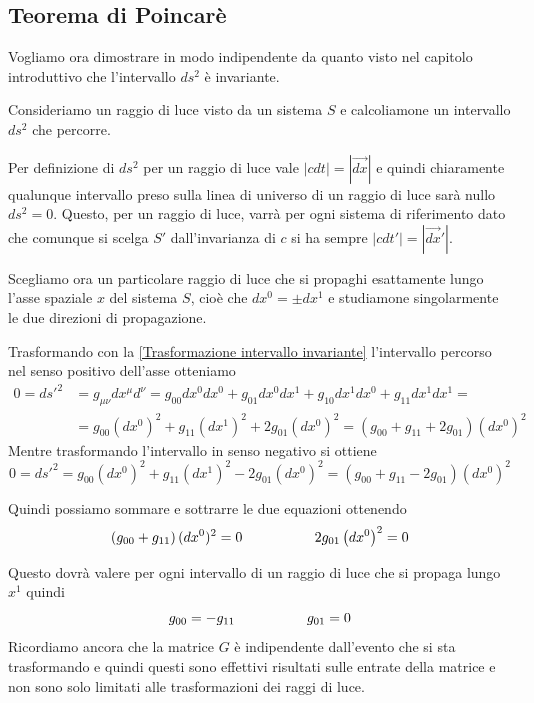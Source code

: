 \documentclass[12pt,a4paper,titlepage, twoside, openright]{book}
\numberwithin{equation}{chapter}
\begin{document}
\subsection{Teorema di Poincarè}\label{sezTeoremaPoincare}
Vogliamo ora dimostrare in modo indipendente da quanto visto nel capitolo introduttivo che l'intervallo $ds^2$ è invariante. 

Consideriamo un raggio di luce visto da un sistema $S$ e calcoliamone un intervallo $ds^2$ che percorre. 

Per definizione di $ds^2$ per un raggio di luce vale
$ \left|cdt\right| =|\vec{dx}| $ e quindi chiaramente qualunque intervallo preso sulla linea di universo di un raggio di luce sarà nullo $ds^2=0$. 
Questo, per un raggio di luce, varrà per ogni sistema di riferimento dato che comunque si scelga $S'$ dall'invarianza di $c$ si ha sempre $ \left|cdt'\right| =|\vec{dx}'| $.

Scegliamo ora un particolare raggio di luce che si propaghi esattamente lungo l'asse spaziale $x$ del sistema $S$, cioè che $dx^0=\pm dx^1$ e studiamone singolarmente le due direzioni di propagazione.

Trasformando con la \eqref{Trasformazione intervallo invariante} l'intervallo percorso nel senso positivo dell'asse otteniamo
\begin{align*}
0 = ds'^2 &= g_{\mu\nu} dx^\mu d^\nu = g_{00} dx^0 dx^0 + g_{01} dx^0 dx^1 + g_{10} dx^1 dx^0 + g_{11} dx^1 dx^1 = \\
&= g_{00}\left(dx^0\right)^2+g_{11}\left(dx^1\right)^2 + 2 g_{01} \left( dx^{0} \right)^2 = \left( g_{00} + g_{11} + 2g_{01} \right) (dx^0)^2
\end{align*}
Mentre trasformando l'intervallo in senso negativo si ottiene
\[
0 = ds'^2 = g_{00}\left(dx^0\right)^2+g_{11}\left(dx^1\right)^2 - 2 g_{01} \left( dx^{0} \right)^2 = \left( g_{00} + g_{11} - 2g_{01} \right) (dx^0)^2
\]

Quindi possiamo sommare e sottrarre le due equazioni ottenendo
\begin{equation}
\left( g_{00}+g_{11} \right) (dx^0)^2=0 \hspace{0.15\linewidth} 2g_{01} \left(dx^0\right)^2=0
\end{equation}

Questo dovrà valere per ogni intervallo di un raggio di luce che si propaga lungo $x^1$ quindi 
\[ g_{00}=-g_{11} \hspace{0.15\linewidth} g_{01}=0 \]
Ricordiamo ancora che la matrice $G$ è indipendente dall'evento che si sta trasformando e quindi questi sono effettivi risultati sulle entrate della matrice e non sono solo limitati alle trasformazioni dei raggi di luce.
\end{document}
